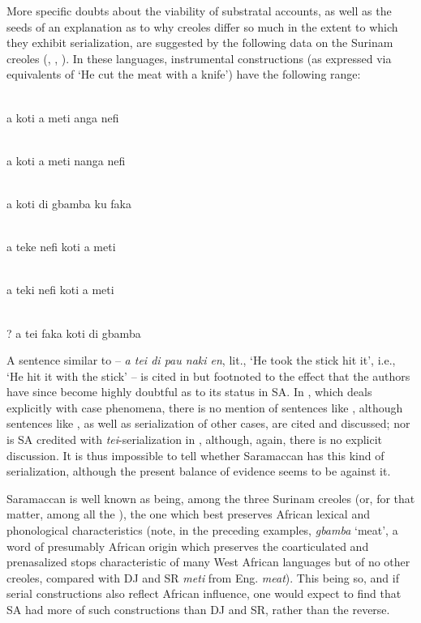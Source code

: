More specific doubts about the viability of substratal accounts, as well as the seeds of an explanation as to why creoles differ so much in the extent to which they exhibit serialization, are suggested by the following data on the Surinam creoles (, , ). In these languages, instrumental constructions (as expressed via equiva\-lents of `He cut the meat with a knife') have the following range:

\ea\label{ex:2:228}
\langinfo{\langDJ}{}{}\\
a koti a meti anga nefi
\z

\ea\label{ex:2:229}
\langinfo{\langSR}{}{}\\
a koti a meti nanga nefi
\z

\ea\label{ex:2:230}
\langinfo{\langSA}{}{}\\
a koti di gbamba ku faka
\z

\ea\label{ex:2:231}
\langinfo{\langDJ}{}{}\\
a teke nefi koti a meti
\z

\ea\label{ex:2:232}
\langinfo{\langSR}{}{}\\
a teki nefi koti a meti
\z

\ea\label{ex:2:233}
\langinfo{\langSA}{}{}\\
\textnormal{?} a tei faka koti di gbamba
\z

\noindent A sentence similar to  -- \textit{a tei di pau naki en}, lit., `He took the stick hit it', i.e., `He hit it with the stick' -- is cited in \citet{GrimesEtAl1970} but footnoted to the effect that the authors have since become highly doubtful as to its status in SA. In \citet{Glock1972}, which deals explicitly with case phenomena, there is no mention of sentences like , although sentences like , as well as serialization of other cases, are cited and discussed; nor is SA credited with \textit{tei}-serialization in \citet{JansenEtAl1978}, although, again, there is no explicit discussion. It is thus impossible to tell whether Saramaccan has this kind of serialization, although the present balance of evidence seems to be against it.

Saramaccan is well known as being, among the three Surinam creoles (or, for that matter, among all the ), the one which best preserves African lexical and phonological characteristics
(note, in the preceding examples, \textit{gbamba} `meat', a word of presumably African origin which preserves the coarticulated and prenasalized stops characteristic of many West African languages but of no other creoles, compared with DJ and SR \textit{meti} from Eng. \textit{meat}). This being so, and if serial constructions also reflect African influence, one would expect to find that SA had more of such constructions than DJ and SR, rather than the reverse.

